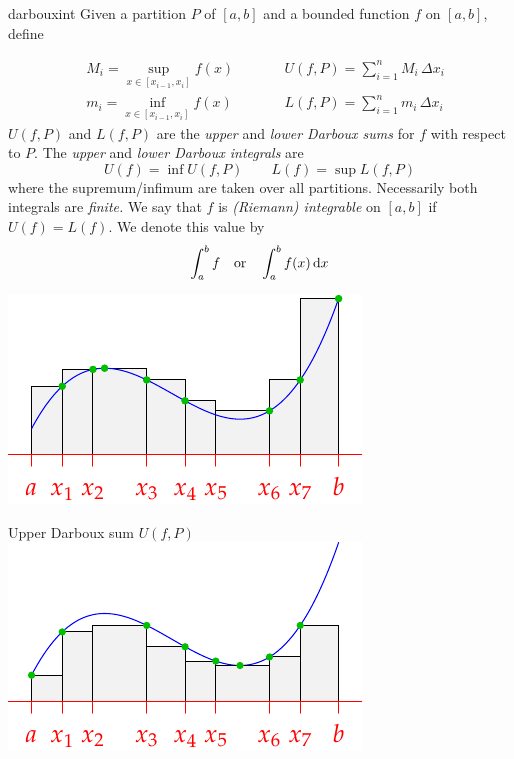 \begin{defn}{}{darbouxint}
	Given a partition $P$ of $[a,b]$ and a bounded function $f$ on $[a,b]$, define\par
	\begin{minipage}[t]{0.6\linewidth}\vspace{-15pt}
		\begin{align*}
			&M_i=\!\!\sup_{x\in [x_{i-1},x_i]}\! f(x)\qquad &&U(f,P)=\sum_{i=1}^n M_i\,\Delta x_i\\
			&m_i=\!\!\inf_{x\in [x_{i-1},x_i]}\! f(x) &&L(f,P)=\sum_{i=1}^n m_i\,\Delta x_i
		\end{align*}
		$U(f,P)$ and $L(f,P)$ are the \emph{upper} and \emph{lower Darboux sums} for $f$ with respect to $P$.
		The \emph{upper} and \emph{lower Darboux integrals} are
		\[
			U(f)=\inf U(f,P)\qquad L(f)=\sup L(f,P)
		\]
		where the supremum/infimum are taken over all partitions. Necessarily both integrals are \emph{finite.}\smallbreak
		We say that $f$ is \emph{(Riemann) integrable} on $[a,b]$ if $U(f)=L(f)$. We denote this value by
		\[
			\int_a^bf\quad\text{or}\quad\int_a^bf(x)\,{\mathrm{d} x}
		\]
		\end{minipage}
		\hfill
		\begin{minipage}[t]{0.39\linewidth}\vspace{-5pt}
			\centering
			\includegraphics[scale=0.95]{darboux-sum-upper}\par
			Upper Darboux sum $U(f,P)$\bigbreak
			\includegraphics[scale=0.95]{darboux-sum-lower}\par

\end{minipage}
\end{defn}
